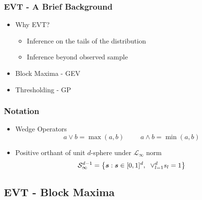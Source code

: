 \documentclass[aspectratio=169]{beamer}
\begin{document}
\begin{frame}
  \frametitle{EVT - A Brief Background}
  \begin{itemize}
    \item Why EVT?
        \begin{itemize}
            \item Inference on the tails of the distribution
            \item Inference beyond observed sample
        \end{itemize}
    \item Block Maxima - GEV
    \item Thresholding - GP
  \end{itemize}
\end{frame} %
\begin{frame}
    \frametitle{Notation}
    \begin{itemize}
      \item Wedge Operators
        \begin{equation*}
            a \vee b = \max(a,b) \hspace{1cm} a\wedge b = \min(a,b)
        \end{equation*} 
      \item Positive orthant of unit $d$-sphere under $\mathcal{L}_{\infty}$ norm
        \begin{equation*}
          \mathcal{S}_{\infty}^{d-1} = \left\lbrace \bm{s} : \bm{s} \in [0,1]^d,\hspace{0.2cm}
                            \vee_{l=1}^d s_l = 1\right\rbrace
        \end{equation*}
    \end{itemize}
    
\end{frame} %

\subsection{EVT - Block Maxima}
\end{document}
